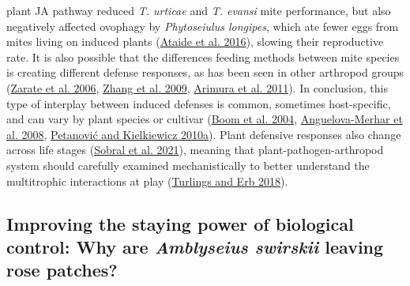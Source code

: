 \documentclass{ufdissertation}[overrideChapters] %
\begin{document}
{plant JA pathway reduced \emph{T. urticae} and \emph{T. evansi} mite performance, but also negatively affected ovophagy by \emph{Phytoseiulus longipes}, which ate fewer eggs from mites living on induced plants (\protect\hyperlink{ref-Ataide2016}{Ataide et al. 2016}), slowing their reproductive rate. It is also possible that the differences feeding methods between mite species is creating different defense responses, as has been seen in other arthropod groups (\protect\hyperlink{ref-Zarate2006}{Zarate et al. 2006}, \protect\hyperlink{ref-Zhang2009}{Zhang et al. 2009}, \protect\hyperlink{ref-Arimura2011}{Arimura et al. 2011}). In conclusion, this type of interplay between induced defenses is common, sometimes host-specific, and can vary by plant species or cultivar (\protect\hyperlink{ref-Boom2004}{Boom et al. 2004}, \protect\hyperlink{ref-AnguelovaMerhar2008}{Anguelova-Merhar et al. 2008}, \protect\hyperlink{ref-Petanovic2010}{Petanović and Kielkiewicz 2010a}). Plant defensive responses also change across life stages (\protect\hyperlink{ref-Sobral2021}{Sobral et al. 2021}), meaning that plant-pathogen-arthropod system should carefully examined mechanistically to better understand the multitrophic interactions at play (\protect\hyperlink{ref-Turlings2018}{Turlings and Erb 2018}).

\hypertarget{improving-the-staying-power-of-biological-control-why-are-amblyseius-swirskii-leaving-rose-patches}{%
\subsection{\texorpdfstring{Improving the staying power of biological control: Why are \emph{Amblyseius swirskii} leaving rose patches?}{Improving the staying power of biological control: Why are Amblyseius swirskii leaving rose patches?}}\label{improving-the-staying-power-of-biological-control-why-are-amblyseius-swirskii-leaving-rose-patches}}

}
\end{document}
